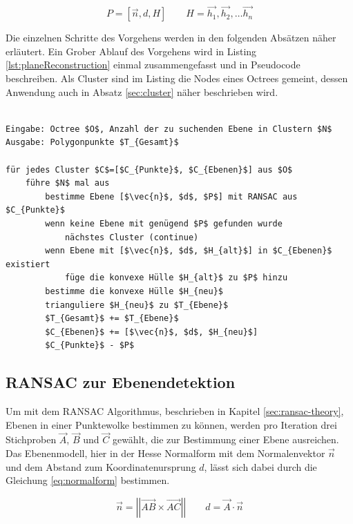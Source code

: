 \begin{equation} \label{eq:plane}
P=\left[\vec{n}, d, H\right] \qquad H=\vec{h_1}, \vec{h_2}, \ldots  \vec{h_n}
\end{equation}

Die einzelnen Schritte des Vorgehens werden in den folgenden Absätzen näher erläutert. Ein Grober Ablauf des Vorgehens wird in Listing \ref{lst:planeReconstruction} einmal zusammengefasst und in Pseudocode beschreiben. Als Cluster sind im Listing die Nodes eines Octrees gemeint, dessen Anwendung auch in Absatz \ref{sec:cluster} näher beschrieben wird.

\begin{lstlisting}[mathescape,caption=Planare Echtzeit Rekonstruktion, label=lst:planeReconstruction]

Eingabe: Octree $O$, Anzahl der zu suchenden Ebene in Clustern $N$
Ausgabe: Polygonpunkte $T_{Gesamt}$

für jedes Cluster $C$=[$C_{Punkte}$, $C_{Ebenen}$] aus $O$
    führe $N$ mal aus
        bestimme Ebene [$\vec{n}$, $d$, $P$] mit RANSAC aus $C_{Punkte}$
        wenn keine Ebene mit genügend $P$ gefunden wurde
            nächstes Cluster (continue)
        wenn Ebene mit [$\vec{n}$, $d$, $H_{alt}$] in $C_{Ebenen}$ existiert	
            füge die konvexe Hülle $H_{alt}$ zu $P$ hinzu	
        bestimme die konvexe Hülle $H_{neu}$
        trianguliere $H_{neu}$ zu $T_{Ebene}$
        $T_{Gesamt}$ += $T_{Ebene}$
        $C_{Ebenen}$ += [$\vec{n}$, $d$, $H_{neu}$]
        $C_{Punkte}$ - $P$
\end{lstlisting}


\subsection{RANSAC zur Ebenendetektion} \label{sec:ransac}

Um mit dem RANSAC Algorithmus, beschrieben in Kapitel \ref{sec:ransac-theory}, Ebenen in einer Punktewolke bestimmen zu können, werden pro Iteration drei Stichproben \(\vec{A}\), \(\vec{B}\) und \(\vec{C}\) gewählt, die zur Bestimmung einer Ebene ausreichen. Das Ebenenmodell, hier in der Hesse Normalform mit dem Normalenvektor \(\vec{n}\) und dem Abstand zum Koordinatenursprung \(d\), lässt sich dabei durch die Gleichung \ref{eq:normalform} bestimmen.

\begin{equation}\label{eq:normalform}
\vec{n} =\left|\left| \vec{AB} \times \vec{AC}\right|\right|
\qquad
d = \vec{A} \cdot \vec{n}
\end{equation}

